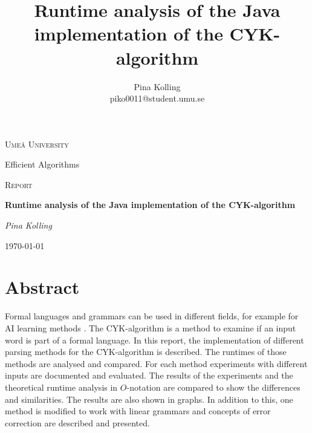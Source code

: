 \documentclass[a4paper, 11pt]{article}
\title{Runtime analysis of the Java implementation of the CYK-algorithm}
\author{Pina Kolling \\ piko0011@student.umu.se}
\begin{document}
\begin{titlepage}
	\centering
	{\scshape\LARGE Ume\r{a} University \par}
	Efficient Algorithms \par
	\vspace{1cm}
	{\scshape\Large Report\par }
	\vspace{1.5cm}
	{\huge\bfseries  Runtime analysis of the Java implementation of the CYK-algorithm \par}
	\vspace{2cm}
	{\Large\itshape Pina Kolling\par}
	\vfill

	{\large \today\par}
\end{titlepage}











\section*{Abstract}

Formal languages and grammars can be used in different fields, for example for AI learning methods \cite{delahaye1987formal, rosenschein1985formal}. The CYK-algorithm is a method to examine if an input word is part of a formal language. 
In this report, the implementation of different parsing methods for the CYK-algorithm is described. The runtimes of those methods are analysed and compared. For each method experiments with different inputs are documented and evaluated. The results of the experiments and the theoretical runtime analysis in $O$-notation are compared to show the differences and similarities. The results are also shown in graphs.
In addition to this, one method is modified to work with linear grammars and concepts of error correction are described and presented. 













\end{document}
